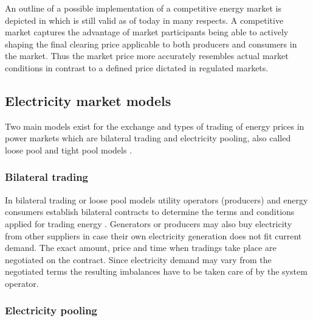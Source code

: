 
An outline of a possible implementation of a competitive energy market is depicted in \cite{hogan1993competitive} which is still valid as of today in many respects. A competitive market captures the advantage of market participants being able to actively shaping the final clearing price applicable to both producers and consumers in the market. Thus the market price more accurately resembles actual market conditions in contrast to a defined price dictated in regulated markets. 




\subsection{Electricity market models}

Two main models exist for the exchange and types of trading of energy prices in power markets which are bilateral trading and electricity pooling, also called loose pool and tight pool models \cite{onaiwu2009does,hogan1997reshaping,barroso2005classification,chao1999design}.

\subsubsection{Bilateral trading}

In bilateral trading or loose pool models utility operators (producers) and energy consumers establish bilateral contracts to determine the terms and conditions applied for trading energy \cite{onaiwu2009does,chao1999design}. Generators or producers may also buy electricity from other suppliers in case their own electricity generation does not fit current demand. The exact amount, price and time when tradings take place are negotiated on the contract. Since electricity demand may vary from the negotiated terms the resulting imbalances have to be taken care of by the system operator. 

\subsubsection{Electricity pooling}

